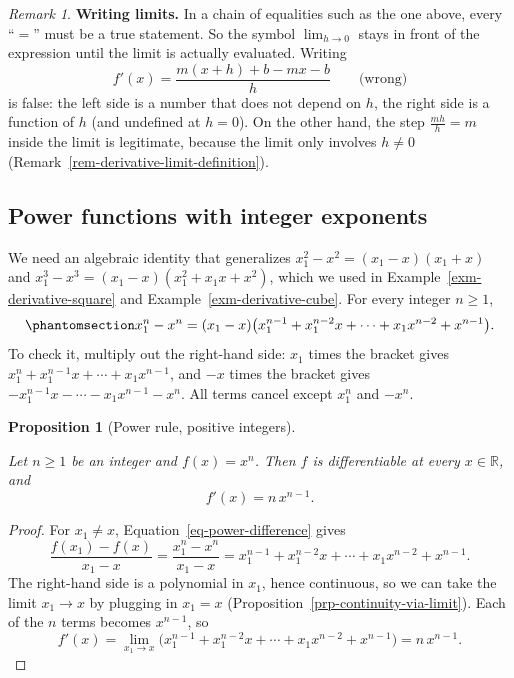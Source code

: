 \documentclass[
  letterpaper,
  DIV=11,
  numbers=noendperiod]{scrreprt}
\theoremstyle{plain}
\theoremstyle{plain}
\newtheorem{proposition}{Proposition}[chapter]
\theoremstyle{definition}
\theoremstyle{definition}
\theoremstyle{definition}
\theoremstyle{plain}
\theoremstyle{plain}
\theoremstyle{remark}
\newtheorem{refremark}{Remark}[chapter]
\begin{document}
\begin{refremark}
\textbf{Writing limits.} In a chain of equalities such as the one above,
every ``\(=\)'' must be a true statement. So the symbol \(\lim_{h\to0}\)
stays in front of the expression until the limit is actually evaluated.
Writing \[
f'(x) = \frac{m(x+h)+b-mx-b}{h} \qquad\text{(wrong)}
\] is false: the left side is a number that does not depend on \(h\),
the right side is a function of \(h\) (and undefined at \(h=0\)). On the
other hand, the step \(\frac{mh}{h}=m\) inside the limit is legitimate,
because the limit only involves \(h\neq0\)
(Remark~\ref{rem-derivative-limit-definition}).

\label{rem-writing-limits}

\end{refremark}

\subsection{Power functions with integer
exponents}\label{power-functions-with-integer-exponents}

We need an algebraic identity that generalizes
\(x_1^2-x^2 = (x_1-x)(x_1+x)\) and
\(x_1^3-x^3=(x_1-x)(x_1^2+x_1x+x^2)\), which we used in
Example~\ref{exm-derivative-square} and
Example~\ref{exm-derivative-cube}. For every integer \(n\ge1\),
\begin{equation}\protect\phantomsection\label{eq-power-difference}{
x_1^n - x^n = (x_1-x)\big(x_1^{n-1} + x_1^{n-2}x + \cdots + x_1x^{n-2} + x^{n-1}\big).
}\end{equation} To check it, multiply out the right-hand side: \(x_1\)
times the bracket gives \(x_1^n + x_1^{n-1}x + \cdots + x_1x^{n-1}\),
and \(-x\) times the bracket gives
\(-x_1^{n-1}x - \cdots - x_1x^{n-1} - x^n\). All terms cancel except
\(x_1^n\) and \(-x^n\).

\begin{proposition}[Power rule, positive
integers]\protect\hypertarget{prp-power-rule-positive}{}\label{prp-power-rule-positive}

Let \(n\ge 1\) be an integer and \(f(x)=x^n\). Then \(f\) is
differentiable at every \(x\in\mathbb{R}\), and \[
f'(x) = n\,x^{n-1}.
\]

\end{proposition}

\begin{proof}
For \(x_1\neq x\), Equation~\ref{eq-power-difference} gives \[
\frac{f(x_1)-f(x)}{x_1-x} = \frac{x_1^n-x^n}{x_1-x}
= x_1^{n-1} + x_1^{n-2}x + \cdots + x_1x^{n-2} + x^{n-1}.
\] The right-hand side is a polynomial in \(x_1\), hence continuous, so
we can take the limit \(x_1\to x\) by plugging in \(x_1=x\)
(Proposition~\ref{prp-continuity-via-limit}). Each of the \(n\) terms
becomes \(x^{n-1}\), so \[
f'(x) = \lim_{x_1\to x}\big(x_1^{n-1} + x_1^{n-2}x + \cdots + x_1x^{n-2} + x^{n-1}\big) = n\,x^{n-1}.
\]
\end{proof}
\end{document}
